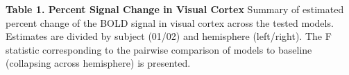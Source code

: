 \documentclass[9pt]{NEU502b-fmri}
\begin{document}
\textbf{Table 1. Percent Signal Change in Visual Cortex} Summary of estimated percent change of the BOLD signal in visual cortex across the tested models. Estimates are divided by subject (01/02) and hemisphere (left/right). The F statistic corresponding to the pairwise comparison of models to baseline (collapsing across hemisphere) is presented.
\end{document}
